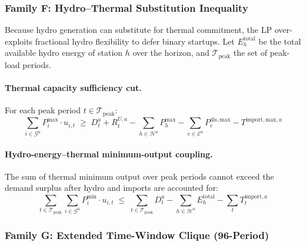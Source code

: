 \subsubsection{Family F: Hydro--Thermal Substitution Inequality}
\label{sec:cut-F}

Because hydro generation can substitute for thermal commitment, the LP
over-exploits fractional hydro flexibility to defer binary startups.
Let $E^{\mathrm{total}}_h$ be the total available hydro energy of
station $h$ over the horizon, and $\mathcal{T}_{\mathrm{peak}}$ the set
of peak-load periods.

\paragraph{Thermal capacity sufficiency cut.}
For each peak period $t \in \mathcal{T}_{\mathrm{peak}}$:
\begin{equation}\label{eq:cut-F-cap}
  \boxed{
    \sum_{i \in \mathcal{G}^a} P^{\max}_i \cdot u_{i,t}
    \;\geq\;
    D^a_t + R^{U,a}_t
    - \sum_{h \in \mathcal{H}^a} P^{\max}_h
    - \sum_{e \in \mathcal{E}^a} P^{\mathrm{dis,max}}_e
    - T^{\mathrm{import,max},a}
  }
\end{equation}

\paragraph{Hydro-energy--thermal minimum-output coupling.}
The sum of thermal minimum output over peak periods cannot exceed the
demand surplus after hydro and imports are accounted for:
\begin{equation}\label{eq:cut-F-energy}
  \sum_{t \in \mathcal{T}_{\mathrm{peak}}}
    \sum_{i \in \mathcal{G}^a} P^{\min}_i \cdot u_{i,t}
  \;\leq\;
  \sum_{t \in \mathcal{T}_{\mathrm{peak}}} D^a_t
  - \sum_{h \in \mathcal{H}^a} E^{\mathrm{total}}_h
  - \sum_t T^{\mathrm{import},a}_t
\end{equation}

\subsubsection{Family G: Extended Time-Window Clique (96-Period)}
\label{sec:cut-G}

